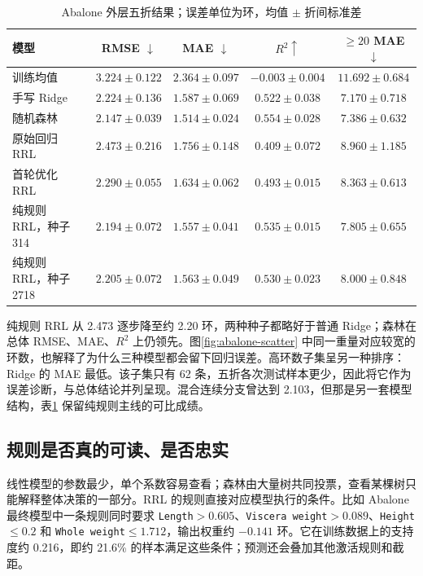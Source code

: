 \documentclass[UTF8,a4paper,11pt]{ctexart}
\begin{document}
\begin{table}[H]
\centering\small
\caption{Abalone 外层五折结果；误差单位为环，均值 $\pm$ 折间标准差}
\label{tab:abalone-results}
\begin{tabular}{@{}lcccc@{}}
\toprule
模型 & RMSE $\downarrow$ & MAE $\downarrow$ & $R^2\uparrow$ & $\ge20$ MAE $\downarrow$\\
\midrule
训练均值 & $3.224\pm0.122$ & $2.364\pm0.097$ & $-0.003\pm0.004$ & $11.692\pm0.684$\\
手写 Ridge & $2.224\pm0.136$ & $1.587\pm0.069$ & $0.522\pm0.038$ & $\mathbf{7.170\pm0.718}$\\
随机森林 & $\mathbf{2.147\pm0.039}$ & $\mathbf{1.514\pm0.024}$ & $\mathbf{0.554\pm0.028}$ & $7.386\pm0.632$\\
原始回归 RRL & $2.473\pm0.216$ & $1.756\pm0.148$ & $0.409\pm0.072$ & $8.960\pm1.185$\\
首轮优化 RRL & $2.290\pm0.055$ & $1.634\pm0.062$ & $0.493\pm0.015$ & $8.363\pm0.613$\\
纯规则 RRL，种子 314 & $2.194\pm0.072$ & $1.557\pm0.041$ & $0.535\pm0.015$ & $7.805\pm0.655$\\
纯规则 RRL，种子 2718 & $2.205\pm0.072$ & $1.563\pm0.049$ & $0.530\pm0.023$ & $8.000\pm0.848$\\
\bottomrule
\end{tabular}
\end{table}

纯规则 RRL 从 2.473 逐步降至约 2.20 环，两种种子都略好于普通 Ridge；森林在总体 RMSE、MAE、$R^2$ 上仍领先。图\ref{fig:abalone-scatter} 中同一重量对应较宽的环数，也解释了为什么三种模型都会留下回归误差。高环数子集呈另一种排序：Ridge 的 MAE 最低。该子集只有 62 条，五折各次测试样本更少，因此将它作为误差诊断，与总体结论并列呈现。混合连续分支曾达到 2.103，但那是另一套模型结构，表\ref{tab:abalone-results} 保留纯规则主线的可比成绩。

\subsection{规则是否真的可读、是否忠实}

线性模型的参数最少，单个系数容易查看；森林由大量树共同投票，查看某棵树只能解释整体决策的一部分。RRL 的规则直接对应模型执行的条件。比如 Abalone 最终模型中一条规则同时要求 \texttt{Length}$>0.605$、\texttt{Viscera weight}$>0.089$、\texttt{Height}$\le0.2$ 和 \texttt{Whole weight}$\le1.712$，输出权重约 $-0.141$ 环。它在训练数据上的支持度约 0.216，即约 21.6\% 的样本满足这些条件；预测还会叠加其他激活规则和截距。
\end{document}
